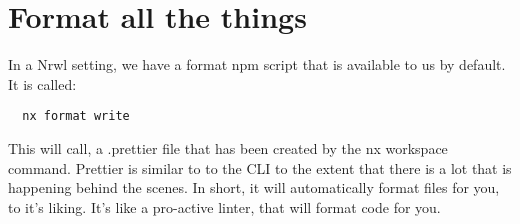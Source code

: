 \maketitle{}
\section{ Format all the things }

In a Nrwl setting, we have a format npm script that is available to us by default.
It is called:

\begin{verbatim}
  nx format write
\end{verbatim}

This will call, a .prettier file that has been created by the nx workspace
command. Prettier is similar to to the CLI to the extent that there is a lot
that is happening behind the scenes. In short, it will automatically format files
for you, to it's liking. It's like a pro-active linter, that will format code
for you.

